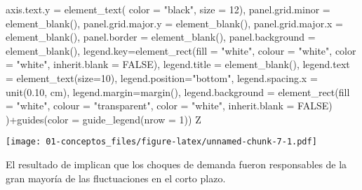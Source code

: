 \documentclass[
]{book}
\newenvironment{Shaded}{\begin{snugshade}}{\end{snugshade}}
\newcommand{\AttributeTok}[1]{\textcolor[rgb]{0.77,0.63,0.00}{#1}}
\newcommand{\ConstantTok}[1]{\textcolor[rgb]{0.00,0.00,0.00}{#1}}
\newcommand{\DecValTok}[1]{\textcolor[rgb]{0.00,0.00,0.81}{#1}}
\newcommand{\FloatTok}[1]{\textcolor[rgb]{0.00,0.00,0.81}{#1}}
\newcommand{\FunctionTok}[1]{\textcolor[rgb]{0.00,0.00,0.00}{#1}}
\newcommand{\NormalTok}[1]{#1}
\newcommand{\SpecialCharTok}[1]{\textcolor[rgb]{0.00,0.00,0.00}{#1}}
\newcommand{\StringTok}[1]{\textcolor[rgb]{0.31,0.60,0.02}{#1}}
\begin{document}
\begin{Shaded}
\begin{Highlighting}[]
           \AttributeTok{axis.text.y =} \FunctionTok{element\_text}\NormalTok{( }\AttributeTok{color =} \StringTok{"black"}\NormalTok{, }\AttributeTok{size =} \DecValTok{12}\NormalTok{),}
           \AttributeTok{panel.grid.minor =} \FunctionTok{element\_blank}\NormalTok{(),}
           \AttributeTok{panel.grid.major.y =} \FunctionTok{element\_blank}\NormalTok{(),}
           \AttributeTok{panel.grid.major.x =} \FunctionTok{element\_blank}\NormalTok{(),}
           \AttributeTok{panel.border =} \FunctionTok{element\_blank}\NormalTok{(),}
           \AttributeTok{panel.background =} \FunctionTok{element\_blank}\NormalTok{(),}
           \AttributeTok{legend.key=}\FunctionTok{element\_rect}\NormalTok{(}\AttributeTok{fill =} \StringTok{"white"}\NormalTok{, }\AttributeTok{colour =} \StringTok{"white"}\NormalTok{,}
                                   \AttributeTok{color =} \StringTok{"white"}\NormalTok{, }\AttributeTok{inherit.blank =} \ConstantTok{FALSE}\NormalTok{),}
           \AttributeTok{legend.title =} \FunctionTok{element\_blank}\NormalTok{(),}
           \AttributeTok{legend.text  =} \FunctionTok{element\_text}\NormalTok{(}\AttributeTok{size=}\DecValTok{10}\NormalTok{),}
           \AttributeTok{legend.position=}\StringTok{"bottom"}\NormalTok{,}
           \AttributeTok{legend.spacing.x =} \FunctionTok{unit}\NormalTok{(}\FloatTok{0.10}\NormalTok{, }\StringTok{\textquotesingle{}cm\textquotesingle{}}\NormalTok{),}
           \AttributeTok{legend.margin=}\FunctionTok{margin}\NormalTok{(),}
           \AttributeTok{legend.background =} \FunctionTok{element\_rect}\NormalTok{(}\AttributeTok{fill =} \StringTok{"white"}\NormalTok{, }\AttributeTok{colour =} \StringTok{"transparent"}\NormalTok{,}
                                            \AttributeTok{color =} \StringTok{"white"}\NormalTok{, }\AttributeTok{inherit.blank =} \ConstantTok{FALSE}\NormalTok{)}
\NormalTok{)}\SpecialCharTok{+}\FunctionTok{guides}\NormalTok{(}\AttributeTok{color =} \FunctionTok{guide\_legend}\NormalTok{(}\AttributeTok{nrow =} \DecValTok{1}\NormalTok{))}
\NormalTok{Z}
\end{Highlighting}
\end{Shaded}

\texttt{[image: 01-conceptos\_files/figure-latex/unnamed-chunk-7-1.pdf]}

El resultado de \citet{BLANCHARD88} implican que los choques de demanda fueron responsables de la gran mayoría de las fluctuaciones en el corto plazo.
\end{document}

